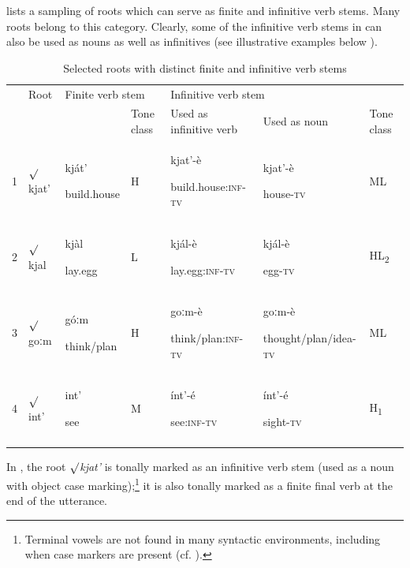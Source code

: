 \documentclass[output=paper]{langsci/langscibook}
\begin{document}
 lists a sampling of roots which can serve as finite and infinitive verb  stems. Many roots belong to this category. Clearly, some of the infinitive verb stems in  can also be used as nouns as well as infinitives (see illustrative examples below ). 

\begin{table}
\caption{Selected roots with distinct finite and infinitive verb stems}
\label{tab:2}

\begin{tabularx}{\textwidth}{XXXXXXX} & Root & \multicolumn{2}{X}{ Finite verb stem} & \multicolumn{3}{X}{ Infinitive verb stem}\\
\lsptoprule
&  &  & Tone class & Used as infinitive verb & Used as noun\index{Noun} & Tone class\\
1 & ${\surd}$kjat' & kj\'{a}t'

build.house & H & kjat'-\`{e}

build.house:\textsc{inf-tv} & kjat'-\`{e}

house\textsc{{}-tv} & ML\\
2 & ${\surd}$kjal & kj\`{a}l

lay.egg & L & kj\'{a}l-\`{e}

lay.egg\textsc{:inf-tv} & kj\'{a}l-\`{e}

egg\textsc{{}-tv} & HL\textsubscript{2}\\
3 & ${\surd}$goːm & g\'{o}ːm

think/plan & H & goːm-\`{e}

think/plan\textsc{:inf-tv} & goːm-\`{e}

thought/plan/idea\textsc{{}-tv} & ML\\
4 & ${\surd}$int' & int'

see & M & \'{i}nt'-\'{e}

see\textsc{:inf-tv} & \'{i}nt'-\'{e}

sight\textsc{{}-tv} & H\textsubscript{1}\\
\lspbottomrule
\end{tabularx}
\end{table}

In , the root \textit{${\surd}$kjat' }is tonally marked as an infinitive verb stem (used as a noun with object case marking);\footnote{Terminal vowels are not found in many syntactic environments, including when case markers are present (cf. \citealt[313]{Ahland2012}).} it is also tonally marked as a finite final verb at the end of the utterance.  
\end{document}
